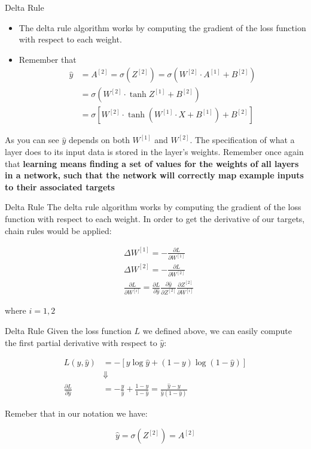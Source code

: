 \documentclass[11pt]{beamer}
\begin{document}
\begin{frame}{Delta Rule}
\begin{itemize}
\item The delta rule algorithm works by computing the gradient of the loss function with respect to each weight. 
\item Remember that
\begin{align*}
\hat y &= A^{[2]} = \sigma\left(Z^{[2]}\right) = \sigma \left( W^{[2]} \cdot A^{[1]} + B^{[2]} \right) \\
&= \sigma \left( W^{[2]} \cdot \tanh{Z^{[1]}} + B^{[2]} \right) \\
&= \sigma \left[ W^{[2]} \cdot \tanh\left( W^{[1]} \cdot X + B^{[1]} \right) + B^{[2]} \right]
\end{align*}
\end{itemize}
\begin{tcolorbox}
As you can see $\hat y$ depends on both $W^{[1]}$ and $W^{[2]}$. The specification of what a layer does to its input data is stored in the layer's weights. Remember once again that \textbf{learning means finding a set of values for the weights of all layers in a network, such that the network will correctly map example inputs to their associated targets} 
\end{tcolorbox}
\end{frame}
\begin{frame}{Delta Rule}
The delta rule algorithm works by computing the gradient of the loss function with respect to each weight. In order to get the derivative of our targets, chain rules would be applied:

\begin{align}
& \Delta W^{[1]} = - \frac{\partial L}{\partial W^{[1]}} \\
& \Delta W^{[2]} = - \frac{\partial L}{\partial W^{[2]}} \\
& \frac{\partial L}{\partial W^{[i]}} =  \frac{\partial L}{\partial \hat y} \frac{\partial \hat y}{\partial Z^{[2]}} \frac{\partial Z^{[2]}}{\partial W^{[i]}} 
\end{align}

where $i=1,2$
\end{frame}
\begin{frame}{Delta Rule}
Given the loss function $L$ we defined above, we can easily compute the first partial derivative with respect to $\hat y$:

\begin{align*}
L(y, \hat{y}) &= -[y\log{\hat{y}} + (1 - y)\log{(1 - \hat{y})}]\\ 
&\Downarrow \\
\frac{\partial L}{\partial \hat y} &= -\frac{y}{\hat y} + \frac{1-y}{1-\hat y} = \frac{\hat y - y}{\hat y(1 - \hat y)}
\end{align*}

Remeber that in our notation we have:

$$\hat y = \sigma\left( Z^{[2]} \right) = A^{[2]}$$
\end{frame}
\end{document}
